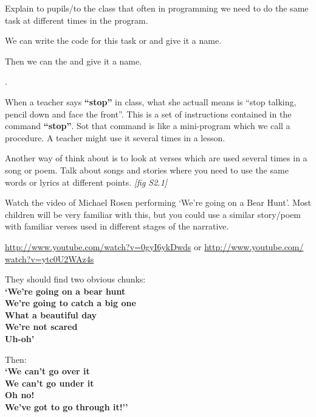 \documentclass{../../../lessonplan}
\begin{document}
\begin{lessonplan}

Explain to pupils/to the class that often in programming we need to do the same task at different times in the program.

We can write the code for this task or  and give it a name.

Then we can  the  and give it a name.

 .

When a teacher says \textbf{``stop''} in class, what she actuall means is ``stop talking, pencil down and face the front''.
This is a set of instructions contained in the command \textbf{``stop''}.
Sot that command is like a mini-program which we call a procedure.
A teacher might use it several times in a lesson.

Another way of think about  is to look at verses which are used several times in a song or poem.
Talk about songs and stories where you need to use the same words or lyrics at different points. \textit{[fig S2.1]}

Watch the video of Michael Rosen performing `We're going on a Bear Hunt'.
Most children will be very familiar with this, but you could use a similar story/poem with familiar verses used in different stages of the narrative.


\url{http://www.youtube.com/watch?v=0gyI6ykDwds} or \url{http://www.youtube.com/ watch?v=ytc0U2WAz4s}


They should find two obvious chunks: \\
\textbf{
`We're going on a bear hunt \\
We're going to catch a big one\\
What a beautiful day\\
We're not scared\\
Uh-oh'
}

Then: \\
\textbf{
`We can't go over it\\
We can't go under it\\
Oh no! \\
We've got to go through it!''
}


\end{lessonplan}
\end{document}
